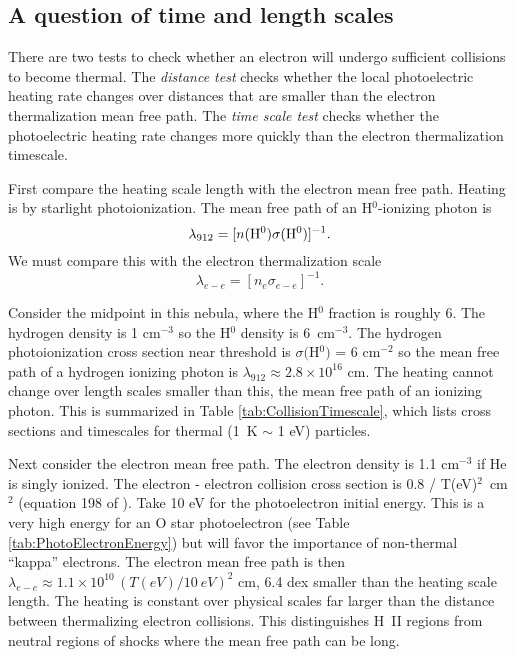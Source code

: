 \documentclass[debug, preprint, twocolumn]{rmaa}
\begin{document}
\subsection{A question of time and length scales}

There are two tests to check whether an electron will undergo sufficient collisions to become thermal.
The \emph{distance test} checks whether the local photoelectric heating rate changes over 
distances that are smaller
than the electron thermalization mean free path.
The \emph{time scale test} checks whether the photoelectric heating rate changes 
more quickly than the electron thermalization timescale.

First compare the heating scale length with the electron mean free path.  
Heating is by starlight photoionization.  
The mean free path of an H$^0$-ionizing photon is
\begin{equation}
\lambda_{912} = [ n({\rm H}^0) \sigma({\rm H}^0) ]^{-1}  .
\end{equation}
We must compare this with the electron thermalization scale
\begin{equation}
\lambda_{e-e} = [ n_e \sigma_{e-e} ]^{-1}  .
\end{equation}

Consider the midpoint in this nebula, where the H$^0$ fraction is roughly 6. 
The hydrogen density is 1 cm$^{-3}$ so the H$^0$ density is 6~cm$^{-3}$.  
The hydrogen photoionization cross section near threshold is 
$\sigma($H$^0)$ = 6 cm$^{-2}$ so the mean free path 
of a hydrogen ionizing photon is $\lambda_{912} \approx 2.8\times 10^{16}$ cm.  
The heating cannot change over length scales smaller than this, the mean free path of an ionizing photon.  
This is summarized in Table \ref{tab:CollisionTimescale}, which lists cross sections
and timescales for thermal (1~K $\sim$ 1 eV) particles.

Next consider the electron mean free path.  
The electron density is 1.1 cm$^{-3}$ if He is singly ionized.  
The electron - electron collision cross section is 0.8 / T(eV)$^2$~cm$^2$ 
(equation 198 of \citealt{2005ppfa.book.....K}).  
Take 10 eV for the photoelectron initial energy.  
This is a very high energy for an O star photoelectron (see Table \ref{tab:PhotoElectronEnergy})
but will favor the importance of non-thermal ``kappa'' electrons.  
The electron mean free path is then 
$\lambda_{e-e} \approx 1.1\times 10^{10} \, (T(eV)/10~eV)^2$ cm, 
6.4 dex smaller than the heating scale length.  
The heating is constant over physical scales far larger than the distance between 
thermalizing electron collisions.
This distinguishes  H~II regions from neutral regions of shocks  where
the mean free path can be long.
\end{document}
